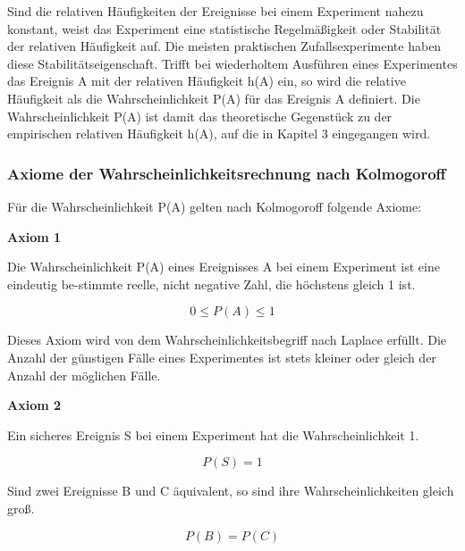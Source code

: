 \noindent Sind die relativen H\"{a}ufigkeiten der Ereignisse bei einem Experiment nahezu konstant, weist das Experiment eine statistische Regelm\"{a}{\ss}igkeit oder Stabilit\"{a}t der relativen H\"{a}ufigkeit auf. Die meisten praktischen Zufallsexperimente haben diese Stabilit\"{a}tseigenschaft. Trifft bei wiederholtem Ausf\"{u}hren eines Experimentes das Ereignis A mit der relativen H\"{a}ufigkeit h(A) ein, so wird die relative H\"{a}ufigkeit als die Wahrscheinlichkeit P(A) f\"{u}r das Ereignis A definiert. Die Wahrscheinlichkeit P(A) ist damit das theoretische Gegenst\"{u}ck zu der empirischen relativen H\"{a}ufigkeit h(A), auf die in Kapitel 3 eingegangen wird.
\clearpage
\subsubsection{Axiome der Wahrscheinlichkeitsrechnung nach Kolmogoroff}

\noindent Für die Wahrscheinlichkeit P(A) gelten nach Kolmogoroff folgende Axiome:\bigskip

{\selectfont
\noindent\textbf{Axiom 1}} \smallskip

\noindent Die Wahrscheinlichkeit P(A) eines Ereignisses A bei einem Experiment ist eine eindeutig be-stimmte reelle, nicht negative Zahl, die höchstens gleich 1 ist.

\begin{equation}\label{eq:twothirtyeight}
0\le P(A)\le 1
\end{equation}

\noindent Dieses Axiom wird von dem Wahrscheinlichkeitsbegriff nach Laplace erf\"{u}llt. Die Anzahl der g\"{u}nstigen F\"{a}lle eines Experimentes ist stets kleiner oder gleich der Anzahl der m\"{o}glichen F\"{a}lle.\bigskip

{\selectfont
\noindent\textbf{Axiom 2}} \smallskip

\noindent Ein sicheres Ereignis S bei einem Experiment hat die Wahrscheinlichkeit 1.

\begin{equation}\label{eq:twothirtynine}
P(S)=1
\end{equation}

\noindent Sind zwei Ereignisse B und C \"{a}quivalent, so sind ihre Wahrscheinlichkeiten gleich gro{\ss}.

\begin{equation}\label{eq:twofourty}
P(B)=P(C)
\end{equation}

